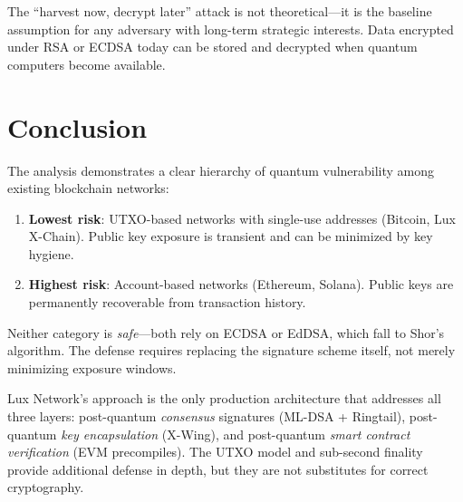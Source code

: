 \documentclass[11pt,a4paper]{article}
\begin{document}
The ``harvest now, decrypt later'' attack is not theoretical---it is
the baseline assumption for any adversary with long-term strategic
interests. Data encrypted under RSA or ECDSA today can be stored and
decrypted when quantum computers become available.

\section{Conclusion}

The analysis demonstrates a clear hierarchy of quantum vulnerability
among existing blockchain networks:

\begin{enumerate}[nosep]
  \item \textbf{Lowest risk}: UTXO-based networks with single-use
        addresses (Bitcoin, Lux X-Chain). Public key exposure is
        transient and can be minimized by key hygiene.
  \item \textbf{Highest risk}: Account-based networks (Ethereum,
        Solana). Public keys are permanently recoverable from
        transaction history.
\end{enumerate}

Neither category is \emph{safe}---both rely on ECDSA or EdDSA,
which fall to Shor's algorithm. The defense requires replacing the
signature scheme itself, not merely minimizing exposure windows.

Lux Network's approach is the only production architecture that
addresses all three layers: post-quantum \emph{consensus} signatures
(ML-DSA + Ringtail), post-quantum \emph{key encapsulation} (X-Wing),
and post-quantum \emph{smart contract verification} (EVM precompiles).
The UTXO model and sub-second finality provide additional defense in
depth, but they are not substitutes for correct cryptography.
\end{document}
